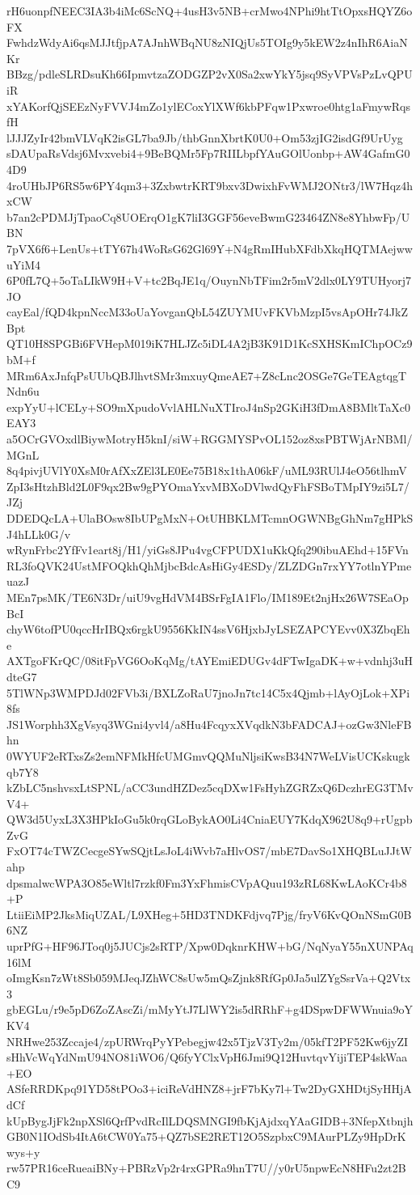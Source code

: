 rH6uonpfNEEC3IA3b4iMc6ScNQ+4usH3v5NB+crMwo4NPhi9htTtOpxsHQYZ6oFX
FwhdzWdyAi6qsMJJtfjpA7AJnhWBqNU8zNIQjUs5TOIg9y5kEW2z4nIhR6AiaNKr
BBzg/pdleSLRDsuKh66IpmvtzaZODGZP2vX0Sa2xwYkY5jsq9SyVPVsPzLvQPUiR
xYAKorfQjSEEzNyFVVJ4mZo1ylECoxYlXWf6kbPFqw1Pxwroe0htg1aFmywRqsfH
lJJJZyIr42bmVLVqK2isGL7ba9Jb/thbGnnXbrtK0U0+Om53zjIG2isdGf9UrUyg
sDAUpaRsVdsj6Mvxvebi4+9BeBQMr5Fp7RIILbpfYAuGOlUonbp+AW4GafmG04D9
4roUHbJP6RS5w6PY4qm3+3ZxbwtrKRT9bxv3DwixhFvWMJ2ONtr3/lW7Hqz4hxCW
b7an2cPDMJjTpaoCq8UOErqO1gK7liI3GGF56eveBwmG23464ZN8e8YhbwFp/UBN
7pVX6f6+LenUs+tTY67h4WoRsG62Gl69Y+N4gRmIHubXFdbXkqHQTMAejwwuYiM4
6P0fL7Q+5oTaLIkW9H+V+tc2BqJE1q/OuynNbTFim2r5mV2dlx0LY9TUHyorj7JO
cayEal/fQD4kpnNccM33oUaYovganQbL54ZUYMUvFKVbMzpI5vsApOHr74JkZBpt
QT10H8SPGBi6FVHepM019iK7HLJZc5iDL4A2jB3K91D1KcSXHSKmIChpOCz9bM+f
MRm6AxJnfqPsUUbQBJlhvtSMr3mxuyQmeAE7+Z8cLnc2OSGe7GeTEAgtqgTNdn6u
expYyU+lCELy+SO9mXpudoVvlAHLNuXTIroJ4nSp2GKiH3fDmA8BMltTaXc0EAY3
a5OCrGVOxdlBiywMotryH5knI/siW+RGGMYSPvOL152oz8xsPBTWjArNBMl/MGnL
8q4pivjUVlY0XsM0rAfXxZEl3LE0Ee75B18x1thA06kF/uML93RUlJ4eO56tlhmV
ZpI3sHtzhBld2L0F9qx2Bw9gPYOmaYxvMBXoDVlwdQyFhFSBoTMpIY9zi5L7/JZj
DDEDQcLA+UlaBOsw8IbUPgMxN+OtUHBKLMTcmnOGWNBgGhNm7gHPkSJ4hLLk0G/v
wRynFrbc2YfFv1eart8j/H1/yiGs8JPu4vgCFPUDX1uKkQfq290ibuAEhd+15FVn
RL3foQVK24UstMFOQkhQhMjbcBdcAsHiGy4ESDy/ZLZDGn7rxYY7otlnYPmeuazJ
MEn7psMK/TE6N3Dr/uiU9vgHdVM4BSrFgIA1Flo/IM189Et2njHx26W7SEaOpBcI
chyW6tofPU0qccHrIBQx6rgkU9556KkIN4ssV6HjxbJyLSEZAPCYEvv0X3ZbqEhe
AXTgoFKrQC/08itFpVG6OoKqMg/tAYEmiEDUGv4dFTwIgaDK+w+vdnhj3uHdteG7
5TlWNp3WMPDJd02FVb3i/BXLZoRaU7jnoJn7tc14C5x4Qjmb+lAyOjLok+XPi8fs
JS1Worphh3XgVsyq3WGni4yvl4/a8Hu4FcqyxXVqdkN3bFADCAJ+ozGw3NleFBhn
0WYUF2eRTxsZs2emNFMkHfcUMGmvQQMuNljsiKwsB34N7WeLVisUCKskugkqb7Y8
kZbLC5nshvsxLtSPNL/aCC3undHZDez5cqDXw1FsHyhZGRZxQ6DczhrEG3TMvV4+
QW3d5UyxL3X3HPkIoGu5k0rqGLoBykAO0Li4CniaEUY7KdqX962U8q9+rUgpbZvG
FxOT74cTWZCecgeSYwSQjtLsJoL4iWvb7aHlvOS7/mbE7DavSo1XHQBLuJJtWahp
dpsmalwcWPA3O85eWltl7rzkf0Fm3YxFhmisCVpAQuu193zRL68KwLAoKCr4b8+P
LtiiEiMP2JksMiqUZAL/L9XHeg+5HD3TNDKFdjvq7Pjg/fryV6KvQOnNSmG0B6NZ
uprPfG+HF96JToq0j5JUCjs2sRTP/Xpw0DqknrKHW+bG/NqNyaY55nXUNPAq16lM
oImgKsn7zWt8Sb059MJeqJZhWC8sUw5mQsZjnk8RfGp0Ja5ulZYgSsrVa+Q2Vtx3
gbEGLu/r9e5pD6ZoZAscZi/mMyYtJ7LlWY2is5dRRhF+g4DSpwDFWWnuia9oYKV4
NRHwe253Zccaje4/zpURWrqPyYPebegjw42x5TjzV3Ty2m/05kfT2PF52Kw6jyZI
sHhVcWqYdNmU94NO81iWO6/Q6fyYClxVpH6Jmi9Q12HuvtqvYijiTEP4skWaa+EO
ASfeRRDKpq91YD58tPOo3+iciReVdHNZ8+jrF7bKy7l+Tw2DyGXHDtjSyHHjAdCf
kUpBygJjFk2npXSl6QrfPvdRcIlLDQSMNGI9fbKjAjdxqYAaGIDB+3NfepXtbnjh
GB0N1IOdSb4ItA6tCW0Ya75+QZ7bSE2RET12O5SzpbxC9MAurPLZy9HpDrKwys+y
rw57PR16ceRueaiBNy+PBRzVp2r4rxGPRa9hnT7U//y0rU5npwEcN8HFu2zt2BC9
